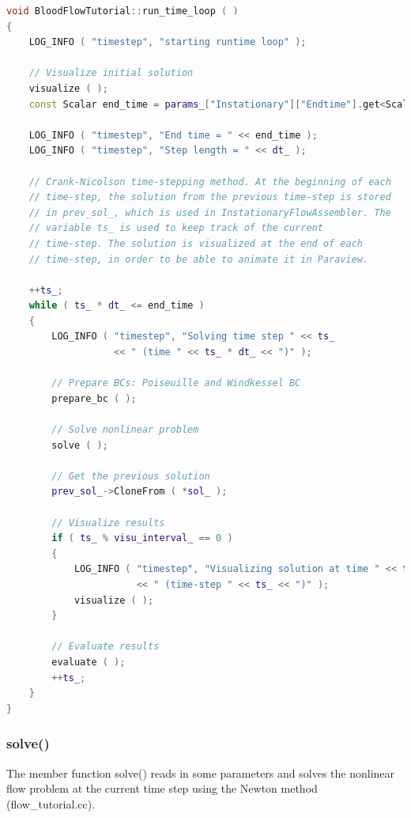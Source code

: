 \documentclass[a4paper, 11pt, twoside]{article}
\begin{document}
\begin{lstlisting}[language=C++, basicstyle={\footnotesize, \ttfamily}, keywordstyle=\color{blue},  numbers=none, tabsize=4]
void BloodFlowTutorial::run_time_loop ( )
{
    LOG_INFO ( "timestep", "starting runtime loop" );

    // Visualize initial solution
    visualize ( );
    const Scalar end_time = params_["Instationary"]["Endtime"].get<Scalar>( );

    LOG_INFO ( "timestep", "End time = " << end_time );
    LOG_INFO ( "timestep", "Step length = " << dt_ );

    // Crank-Nicolson time-stepping method. At the beginning of each
    // time-step, the solution from the previous time-step is stored
    // in prev_sol_, which is used in InstationaryFlowAssembler. The
    // variable ts_ is used to keep track of the current
    // time-step. The solution is visualized at the end of each
    // time-step, in order to be able to animate it in Paraview.

    ++ts_;
    while ( ts_ * dt_ <= end_time )
    {
        LOG_INFO ( "timestep", "Solving time step " << ts_ 
        	       << " (time " << ts_ * dt_ << ")" );

        // Prepare BCs: Poiseuille and Windkessel BC
        prepare_bc ( );

        // Solve nonlinear problem
        solve ( );

        // Get the previous solution
        prev_sol_->CloneFrom ( *sol_ );

        // Visualize results
        if ( ts_ % visu_interval_ == 0 )
        {
            LOG_INFO ( "timestep", "Visualizing solution at time " << ts_ * dt_
                       << " (time-step " << ts_ << ")" );
            visualize ( );
        }

        // Evaluate results
        evaluate ( );
        ++ts_;
    }
}

\end{lstlisting}

\subsubsection{solve()}
The member function solve() reads in some parameters and solves the nonlinear flow problem at the current time step using the Newton method (flow\_tutorial.cc).
\end{document}
